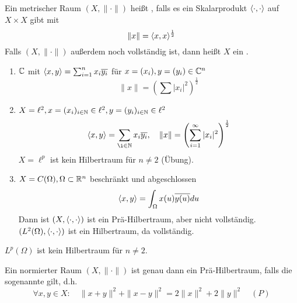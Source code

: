 \begin{definition}
	Ein metrischer Raum $(X, \| \cdot \|)$ hei{\ss}t , falls es ein Skalarprodukt $\langle \cdot, \cdot \rangle$ auf $X \times X$ gibt mit
		\[ \| x \| = \langle x, x \rangle^{\frac{1}{2}} \]
	Falls $(X, \| \cdot \|)$ au{\ss}erdem noch vollständig ist, dann hei{\ss}t $X$ ein .	
\end{definition}


\begin{beispiel}
	\begin{enumerate}[label=\alph*\upshape)]
		\item $\mathbb{C}$ mit $\langle x, y \rangle = \sum_{i = 1}^{n} x_{i} \overline{y_{i}}$ für $x = (x_{i}), y = (y_{i}) \in \mathbb{C}^{n}$ \\
			\[ \| x \| = \left( \sum | x_{i}|^{2} \right)^{\frac{1}{2}} \]
		\item $X = \ell^{2}, x = (x_{i})_{i \in \mathbb{N}} \in \ell^{2}, y = (y_{i})_{i \in \mathbb{N}} \in \ell^{2}$ \\
			\[ \< x, y \> = \sum_{\i \in \MdN} x_{i} \overline{y_{i}},  \quad \|x \| = \left( \sum_{i = 1}^{\infty} |x_{i}|^{2} \right)^{\frac{1}{2}} \]
			$X = \ell^{p}$ ist kein Hilbertraum für $n \neq 2$ (Übung).
		\item $X = C(\Omega), \Omega \subset \mathbb{R}^{n}$ beschränkt und abgeschlossen \\
			\[ \langle x, y \rangle = \int_{\Omega} x(u) \overline{y(u)} du \]
			Dann ist $(X, \langle \cdot, \cdot \rangle)$ ist ein Prä-Hilbertraum, aber nicht vollständig. \\
			$(L^{2}(\Omega), \langle \cdot, \cdot \rangle)$ ist ein Hilbertraum, da vollständig.
	\end{enumerate}	
\end{beispiel}


\begin{bemerkung*}
	$L^{p}(\Omega)$ ist kein Hilbertraum für $n \neq 2$.
\end{bemerkung*}


\begin{satz} \label{satz:15.6}
	Ein normierter Raum $(X, \| \cdot \|)$ ist genau dann ein Prä-Hilbertraum, falls die sogenannte  gilt, d.h.
	\[ \forall x, y \in X: \quad \|x + y \|^{2} + \| x - y \|^{2} = 2 \| x \|^{2} + 2 \| y \|^{2} \quad (P) \label{eq:15.6-rallelogrammGleichung} \]
\end{satz}

